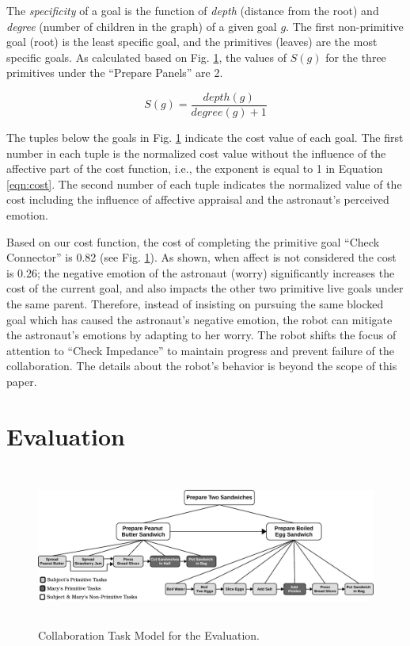 The \textit{specificity} of a goal is the function of \textit{depth} (distance
from the root) and \textit{degree} (number of children in the graph) of a given
goal $g$. The first non-primitive goal (root) is the least specific goal, and
the primitives (leaves) are the most specific goals. As calculated based on Fig.
\ref{fig:taskModel}, the values of $S(g)$ for the three primitives under the
``Prepare Panels'' are 2.

\begin{equation}
S(g) = \frac{depth(g)}{degree(g)+1}
\label{eqn:specificity}
\end{equation}

\vspace*{-1mm}
The tuples below the goals in Fig. \ref{fig:taskModel} indicate the cost value
of each goal. The first number in each tuple is the normalized cost value
without the influence of the affective part of the cost function, i.e., the
exponent is equal to 1 in Equation \ref{eqn:cost}. The second number of each
tuple indicates the normalized value of the cost including the influence of
affective appraisal and the astronaut's perceived emotion.

Based on our cost function, the cost of completing the primitive goal ``Check
Connector'' is 0.82 (see Fig. \ref{fig:taskModel}). As shown, when affect is
not considered the cost is 0.26; the negative emotion of the astronaut (worry)
significantly increases the cost of the current goal, and also impacts the other
two primitive live goals under the same parent. Therefore, instead of insisting
on pursuing the same blocked goal which has caused the astronaut's negative
emotion, the robot can mitigate the astronaut's emotions by adapting to her
worry. The robot shifts the focus of attention to ``Check Impedance'' to
maintain progress and prevent failure of the collaboration. The details about
the robot's behavior is beyond the scope of this paper.

\section{Evaluation}
\label{sec:user-study}

\begin{figure}
  \centering
  \includegraphics[width=16cm,height=5.25cm]{figure/taskModel-croped.pdf}
  \caption{Collaboration Task Model for the Evaluation.}
  \label{fig:taskModel}
\end{figure}

